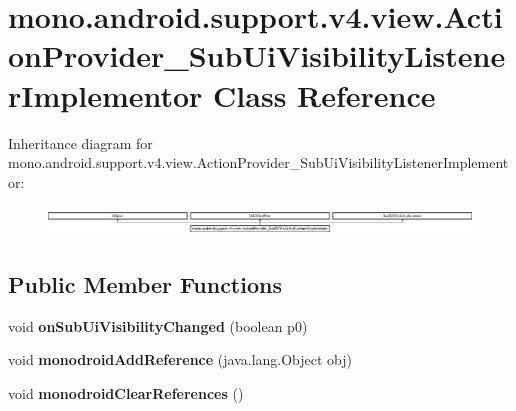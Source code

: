 \hypertarget{classmono_1_1android_1_1support_1_1v4_1_1view_1_1_action_provider___sub_ui_visibility_listener_implementor}{}\section{mono.\+android.\+support.\+v4.\+view.\+Action\+Provider\+\_\+\+Sub\+Ui\+Visibility\+Listener\+Implementor Class Reference}
\label{classmono_1_1android_1_1support_1_1v4_1_1view_1_1_action_provider___sub_ui_visibility_listener_implementor}
Inheritance diagram for mono.\+android.\+support.\+v4.\+view.\+Action\+Provider\+\_\+\+Sub\+Ui\+Visibility\+Listener\+Implementor\+:\begin{figure}[H]
\begin{center}
\leavevmode
\includegraphics[height=0.779402cm]{classmono_1_1android_1_1support_1_1v4_1_1view_1_1_action_provider___sub_ui_visibility_listener_implementor}
\end{center}
\end{figure}
\subsection*{Public Member Functions}
\begin{DoxyCompactItemize}
\item 
\mbox{\label{classmono_1_1android_1_1support_1_1v4_1_1view_1_1_action_provider___sub_ui_visibility_listener_implementor_aa16b4664c4316a46993433708b3c1aaa}} 
void {\bfseries on\+Sub\+Ui\+Visibility\+Changed} (boolean p0)
\item 
\mbox{\label{classmono_1_1android_1_1support_1_1v4_1_1view_1_1_action_provider___sub_ui_visibility_listener_implementor_ad3bcf21e43259fd4af4b11e26ebea1bb}} 
void {\bfseries monodroid\+Add\+Reference} (java.\+lang.\+Object obj)
\item 
\mbox{\label{classmono_1_1android_1_1support_1_1v4_1_1view_1_1_action_provider___sub_ui_visibility_listener_implementor_aec92bae58c7fb25db74b6fc78f8d9eeb}} 
void {\bfseries monodroid\+Clear\+References} ()
\end{DoxyCompactItemize}
